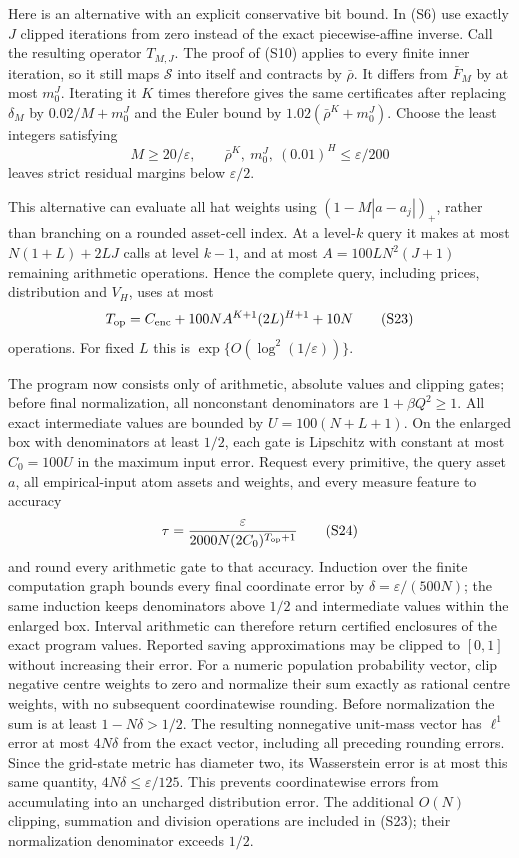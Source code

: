 \documentclass[11pt,a4paper]{article}
\begin{document}
Here is an alternative with an explicit conservative bit bound.
In \textup{(S6)} use exactly $J$ clipped iterations from zero instead
of the exact piecewise-affine inverse. Call the resulting operator
$T_{M,J}$. The proof of \textup{(S10)} applies to every finite inner
iteration, so it still maps $\mathcal S$ into itself and contracts
by $\bar\rho$. It differs from $\bar F_M$ by at most $m_0^J$. Iterating
it $K$ times therefore gives the same certificates after replacing
$\delta_M$ by $0.02/M+m_0^J$ and the Euler bound by
$1.02(\bar\rho^K+m_0^J)$. Choose the least integers satisfying
\[
 M\geq20/\varepsilon,\qquad
 \bar\rho^K,\ m_0^J,\ (0.01)^H\leq\varepsilon/200
 \tag{S22}
\]
leaves strict residual margins below $\varepsilon/2$.

This alternative can evaluate all hat weights using
$(1-M|a-a_j|)_+$, rather than branching on a rounded asset-cell
index. At a level-$k$ query it makes at most
$N(1+L)+2LJ$ calls at level $k-1$, and at most
$A=100LN^2(J+1)$ remaining arithmetic operations. Hence the complete
query, including prices, distribution and $V_H$, uses at most
\[
 T_{\rm op}=C_{\rm enc}+100N A^{K+1}(2L)^{H+1}+10N
 \tag{S23}
\]
operations. For fixed $L$ this is
$\exp\{O(\log^2(1/\varepsilon))\}$.

The program now consists only of arithmetic, absolute values and
clipping gates; before final normalization, all nonconstant denominators are
$1+\beta Q^2\geq1$. All exact intermediate values are bounded by
$U=100(N+L+1)$. On the enlarged box with denominators at least
$1/2$, each gate is Lipschitz with constant at most $C_0=100U$
in the maximum input error. Request every primitive, the query asset
$a$, all empirical-input atom assets and weights, and every measure
feature to accuracy
\[
 \tau=\frac{\varepsilon}{2000N(2C_0)^{T_{\rm op}+1}}
 \tag{S24}
\]
and round every arithmetic gate to that accuracy. Induction over
the finite computation graph bounds every final coordinate error by
$\delta=\varepsilon/(500N)$; the same induction keeps denominators above
$1/2$ and intermediate values within the enlarged box.
Interval arithmetic can therefore return certified enclosures of
the exact program values. Reported saving approximations may be
clipped to $[0,1]$ without increasing their error.
For a numeric population probability vector, clip negative centre
weights to zero and normalize their sum exactly as rational centre
weights, with no subsequent coordinatewise rounding. Before normalization the
sum is at least $1-N\delta>1/2$. The resulting nonnegative unit-mass
vector has $\ell^1$ error at most $4N\delta$ from the exact vector,
including all preceding rounding errors. Since the grid-state metric
has diameter two, its Wasserstein error is at most this same quantity,
$4N\delta\leq\varepsilon/125$. This prevents coordinatewise errors
from accumulating into an uncharged distribution error. The additional
$O(N)$ clipping, summation and division operations are included in
\textup{(S23)}; their normalization denominator exceeds $1/2$.
\end{document}
